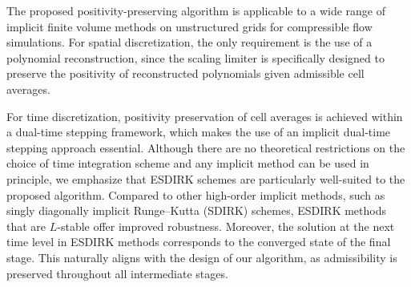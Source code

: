The proposed positivity-preserving algorithm is applicable to a wide range of implicit finite volume methods on unstructured grids for compressible flow simulations. For spatial discretization, the only requirement is the use of a polynomial reconstruction, since the scaling limiter is specifically designed to preserve the positivity of reconstructed polynomials given admissible cell averages.

For time discretization, positivity preservation of cell averages is achieved within a dual-time stepping framework, which makes the use of an implicit dual-time stepping approach essential. Although there are no theoretical restrictions on the choice of time integration scheme and any implicit method can be used in principle, we emphasize that ESDIRK schemes are particularly well-suited to the proposed algorithm. Compared to other high-order implicit methods, such as singly diagonally implicit Runge–Kutta (SDIRK) schemes, ESDIRK methods that are $L$-stable offer improved robustness. Moreover, the solution at the next time level in ESDIRK methods corresponds to the converged state of the final stage. This naturally aligns with the design of our algorithm, as admissibility is preserved throughout all intermediate stages.



\endgroup
